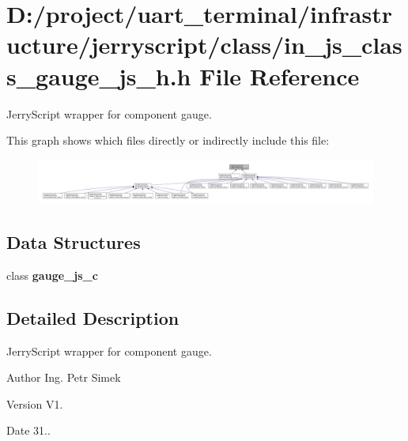 \section{D\+:/project/uart\+\_\+terminal/infrastructure/jerryscript/class/in\+\_\+js\+\_\+class\+\_\+gauge\+\_\+js\+\_\+h.h File Reference}
\label{in__js__class__gauge__js__h_8h}


Jerry\+Script wrapper for component gauge.  


This graph shows which files directly or indirectly include this file\+:\nopagebreak
\begin{figure}[H]
\begin{center}
\leavevmode
\includegraphics[width=350pt]{in__js__class__gauge__js__h_8h__dep__incl}
\end{center}
\end{figure}
\subsection*{Data Structures}
\begin{DoxyCompactItemize}
\item 
class \textbf{ gauge\+\_\+js\+\_\+c}
\end{DoxyCompactItemize}


\subsection{Detailed Description}
Jerry\+Script wrapper for component gauge. 

\begin{DoxyAuthor}{Author}
Ing. Petr Simek 
\end{DoxyAuthor}
\begin{DoxyVersion}{Version}
V1. 
\end{DoxyVersion}
\begin{DoxyDate}{Date}
31.. 
\end{DoxyDate}
